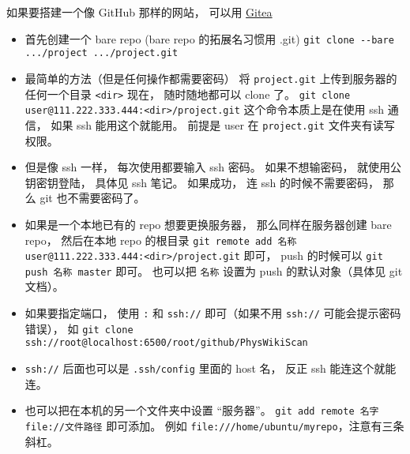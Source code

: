 
\begin{issues}
\issueDraft
\end{issues}


如果要搭建一个像 GitHub 那样的网站， 可以用 \href{https://github.com/go-gitea/gitea}{Gitea}

\begin{itemize}
\item 首先创建一个 bare repo (bare repo 的拓展名习惯用 .git)
\verb|git clone --bare .../project .../project.git|

\item 最简单的方法（但是任何操作都需要密码）
将 \verb|project.git| 上传到服务器的任何一个目录 \verb|<dir>|
现在， 随时随地都可以 clone 了。
\verb`git clone user@111.222.333.444:<dir>/project.git`
这个命令本质上是在使用 ssh 通信， 如果 ssh 能用这个就能用。
前提是 user 在 \verb|project.git| 文件夹有读写权限。

\item 但是像 ssh 一样， 每次使用都要输入 ssh 密码。 如果不想输密码， 就使用公钥密钥登陆， 具体见 ssh 笔记。 如果成功， 连 ssh 的时候不需要密码， 那么 git 也不需要密码了。

\item 如果是一个本地已有的 repo 想要更换服务器， 那么同样在服务器创建 bare repo， 然后在本地 repo 的根目录 \verb`git remote add 名称 user@111.222.333.444:<dir>/project.git` 即可， push 的时候可以 \verb`git push 名称 master` 即可。 也可以把 \verb`名称` 设置为 push 的默认对象（具体见 git 文档）。

\item 如果要指定端口， 使用 \verb`:` 和 \verb`ssh://` 即可（如果不用 \verb`ssh://` 可能会提示密码错误）， 如 \verb`git clone ssh://root@localhost:6500/root/github/PhysWikiScan`

\item \verb|ssh://| 后面也可以是 \verb|.ssh/config| 里面的 host 名， 反正 ssh 能连这个就能连。

\item 也可以把在本机的另一个文件夹中设置 “服务器”。 \verb|git add remote 名字 file://文件路径| 即可添加。 例如 \verb|file:///home/ubuntu/myrepo|，注意有三条斜杠。
\end{itemize}

